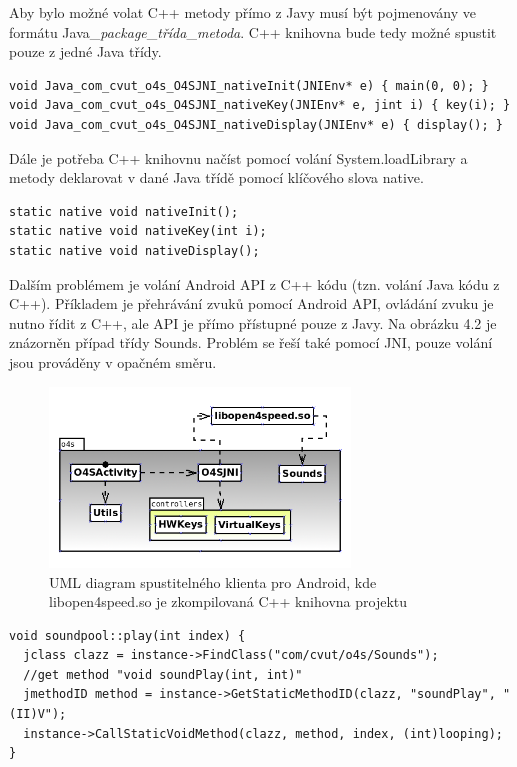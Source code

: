 \documentclass[11pt,twoside,a4paper]{book}
\begin{document}
Aby bylo možné volat C++ metody přímo z Javy musí být pojmenovány ve formátu Java\_\textit{package}\_\textit{třída}\_\textit{metoda}. C++ knihovna bude tedy možné spustit pouze z jedné Java třídy.
\lstset{language=C++} 
\begin{lstlisting}[caption=Volání metod pomocí JNI v C++ pro nahrazení freeglut knihovny]
void Java_com_cvut_o4s_O4SJNI_nativeInit(JNIEnv* e) { main(0, 0); }
void Java_com_cvut_o4s_O4SJNI_nativeKey(JNIEnv* e, jint i) { key(i); }
void Java_com_cvut_o4s_O4SJNI_nativeDisplay(JNIEnv* e) { display(); }
\end{lstlisting}

Dále je potřeba C++ knihovnu načíst pomocí volání System.loadLibrary a metody deklarovat v dané Java třídě pomocí klíčového slova native.

\lstset{language=Java} 
\begin{lstlisting}[caption=Ukázka deklarování C++ metod v Java kódu]
static native void nativeInit();
static native void nativeKey(int i);
static native void nativeDisplay();
\end{lstlisting}

Dalším problémem je volání Android API z C++ kódu (tzn. volání Java kódu z C++). Příkladem je přehrávání zvuků pomocí Android API, ovládání zvuku je nutno řídit z C++, ale API je přímo přístupné pouze z Javy. Na obrázku 4.2 je znázorněn případ třídy Sounds. Problém se řeší také pomocí JNI, pouze volání jsou prováděny v opačném směru.

\begin{center}
\begin{figure}[h]
\includegraphics[width=80mm]{figures/jni.png}
\caption{UML diagram spustitelného klienta pro Android, kde libopen4speed.so je zkompilovaná C++ knihovna projektu}
\end{figure}
\end{center}

\lstset{language=C++} 
\begin{lstlisting}[caption=Volání Java metody pro přehrání zvuku z C++ kódu]
void soundpool::play(int index) {
  jclass clazz = instance->FindClass("com/cvut/o4s/Sounds");
  //get method "void soundPlay(int, int)"
  jmethodID method = instance->GetStaticMethodID(clazz, "soundPlay", "(II)V");
  instance->CallStaticVoidMethod(clazz, method, index, (int)looping);
}
\end{lstlisting}
\end{document}
